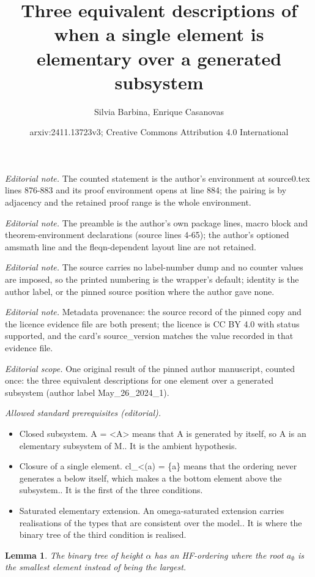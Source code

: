 \documentclass[10pt,a4paper]{article}
\title{Three equivalent descriptions of when a single element is elementary over a generated subsystem}
\author{Silvia Barbina, Enrique Casanovas}
\date{arxiv:2411.13723v3; Creative Commons Attribution 4.0 International}
\theoremstyle{note}
\newtheorem{lemma}[thm]{Lemma}
\begin{document}
\maketitle
\noindent\textit{Editorial note.} The counted statement is the author's environment at source0.tex lines 876-883 and its proof environment opens at line 884; the pairing is by adjacency and the retained proof range is the whole environment.\par\medskip
\noindent\textit{Editorial note.} The preamble is the author's own package lines, macro block and theorem-environment declarations (source lines 4-65); the author's optioned amsmath line and the fleqn-dependent layout line are not retained.\par\medskip
\noindent\textit{Editorial note.} The source carries no label-number dump and no counter values are imposed, so the printed numbering is the wrapper's default; identity is the author label, or the pinned source position where the author gave none.\par\medskip
\noindent\textit{Editorial note.} Metadata provenance: the source record of the pinned copy and the licence evidence file are both present; the licence is CC BY 4.0 with status supported, and the card's source\_version matches the value recorded in that evidence file.\par\medskip
\noindent\textit{Editorial scope.} One original result of the pinned author manuscript, counted once: the three equivalent descriptions for one element over a generated subsystem (author label May\_26\_2024\_1).\par\medskip
\noindent\textit{Allowed standard prerequisites (editorial).}\begin{itemize}
\item Closed subsystem. A = <A> means that A is generated by itself, so A is an elementary subsystem of M.. It is the ambient hypothesis.
\item Closure of a single element. cl\_<(a) = \{a\} means that the ordering never generates a below itself, which makes a the bottom element above the subsystem.. It is the first of the three conditions.
\item Saturated elementary extension. An omega-saturated extension carries realisations of the types that are consistent over the model.. It is where the binary tree of the third condition is realised.
\end{itemize}\medskip
\begin{lemma}\label{April_11_2024_2} The binary tree of height $\alpha$ has an HF-ordering where the root  $a_\emptyset$ is the smallest element instead of being the largest.
\end{lemma}
\end{document}
